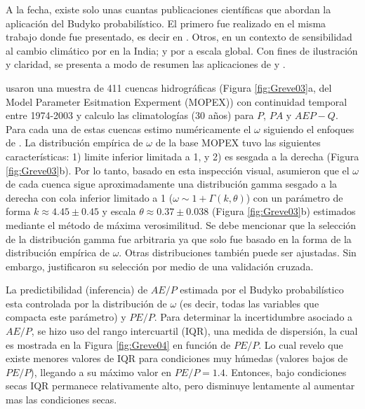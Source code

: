 \documentclass[12pt]{article}
\begin{document}
A la fecha, existe solo unas cuantas publicaciones científicas que abordan la aplicación del Budyko probabilístico. El primero fue realizado en el misma trabajo donde fue presentado, es decir en \citet{Greve2015}. Otros, en un contexto de sensibilidad al cambio climático por \cite{Singh2015} en la India; y por \citet{gudmundsson2016sensitivity} a escala global. Con fines de ilustración y claridad, se presenta a modo de resumen las aplicaciones de \citet{Greve2015} y \citet{Singh2015}.

\clearpage

\clearpage

\citet{Greve2015} usaron una muestra de 411 cuencas hidrográficas (Figura \ref{fig:Greve03}a, del Model Parameter Esitmation Experment (MOPEX)) con continuidad temporal entre 1974-2003 y calculo las climatologías (30 años) para $P$, $PA$ y $AE P - Q$. Para cada una de estas cuencas estimo numéricamente el $\omega$ siguiendo el enfoques de \citet{Zhang2004}. La distribución empírica de $\omega$ de la base MOPEX tuvo las siguientes características: 1) limite inferior limitada a 1, y 2) es sesgada a la derecha (Figura \ref{fig:Greve03}b). Por lo tanto, basado en esta inspección visual, \citet{Greve2015} asumieron que el $\omega$ de cada cuenca sigue aproximadamente una distribución gamma sesgado a la derecha con cola inferior limitado a 1 ($\omega \sim 1 + \Gamma (k, \theta )$) con un parámetro de forma $k \approx 4.45 \pm 0.45$ y escala $\theta \approx 0.37 \pm 0.038$ (Figura \ref{fig:Greve03}b) estimados mediante el método de máxima verosimilitud. Se debe mencionar que la selección de la distribución gamma fue arbitraria ya que solo fue basado en la forma de la distribución empírica de $\omega$. Otras distribuciones también puede ser ajustadas. Sin embargo, \citet{Greve2015} justificaron su selección por medio de una validación cruzada.

La predictibilidad (inferencia) de $AE/P$ estimada por el Budyko probabilístico esta controlada por la distribución de $\omega$ (es decir, todas las variables que compacta este parámetro) y $PE/P$. Para determinar la incertidumbre asociado a $AE/P$, se hizo uso del rango intercuartil (IQR), una medida de dispersión, la cual es mostrada en la Figura \ref{fig:Greve04} en función de $PE/P$. Lo cual revelo que existe menores valores de IQR para condiciones muy húmedas (valores bajos de $PE/P$), llegando a su máximo valor en $PE/P = 1.4$. Entonces, bajo condiciones secas IQR permanece relativamente alto, pero disminuye lentamente al aumentar mas las condiciones secas. %
\end{document}
